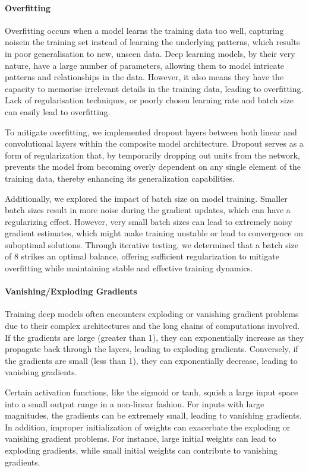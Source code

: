 \paragraph*{Overfitting}
\label{par:4_overfitting}
Overfitting occurs when a model learns the training data too well, capturing noisein the training set instead of learning the underlying patterns, which results in poor generalisation to new, unseen data. Deep learning models, by their very nature, have a large number of parameters, allowing them to model intricate patterns and relationships in the data. However, it also means they have the capacity to memorise irrelevant details in the training data, leading to overfitting. Lack of regularisation techniques, or poorly chosen learning rate and batch size can easily lead to overfitting. 

To mitigate overfitting, we implemented dropout layers between both linear and convolutional layers within the composite model architecture. Dropout serves as a form of regularization that, by temporarily dropping out units from the network, prevents the model from becoming overly dependent on any single element of the training data, thereby enhancing its generalization capabilities.

Additionally, we explored the impact of batch size on model training. Smaller batch sizes result in more noise during the gradient updates, which can have a regularizing effect. However, very small batch sizes can lead to extremely noisy gradient estimates, which might make training unstable or lead to convergence on suboptimal solutions. Through iterative testing, we determined that a batch size of 8 strikes an optimal balance, offering sufficient regularization to mitigate overfitting while maintaining stable and effective training dynamics.

\paragraph*{Vanishing/Exploding Gradients}
\label{par:4_vanishing_exploding_gradients}
Training deep models often encounters exploding or vanishing gradient problems due to their complex architectures and the long chains of computations involved. If the gradients are large (greater than 1), they can exponentially increase as they propagate back through the layers, leading to exploding gradients. Conversely, if the gradients are small (less than 1), they can exponentially decrease, leading to vanishing gradients. 

Certain activation functions, like the sigmoid or tanh, squish a large input space into a small output range in a non-linear fashion. For inputs with large magnitudes, the gradients can be extremely small, leading to vanishing gradients. In addition, improper initialization of weights can exacerbate the exploding or vanishing gradient problems. For instance, large initial weights can lead to exploding gradients, while small initial weights can contribute to vanishing gradients.

